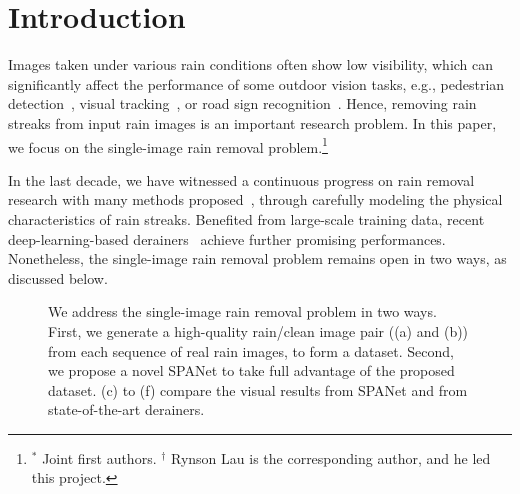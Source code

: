 \documentclass[10pt,twocolumn,letterpaper]{article}
\begin{document}
\section{Introduction}
Images taken under various rain conditions often show low visibility, which can significantly affect the performance of some outdoor vision tasks, e.g., pedestrian detection~\cite{mao:cvpr:2017:pd}, visual tracking~\cite{song:cvpr:2018:vital}, or road sign recognition~\cite{zhu:cvpr:2016:tsd}. Hence, removing rain streaks from input rain images is an important research problem. In this paper, we focus on the single-image rain removal problem.{\let\thefootnote\relax\footnote{{$^{*}$ Joint first authors. $^{\dagger}$ Rynson Lau is the corresponding author, and he led this project.}}}


In the last decade, we have witnessed a continuous progress on rain removal research with many methods proposed~\cite{kang:tip:2012:imgdecomp,luo:iccv:2015:dsc,li:cvpr:2016:lp,chang:iccv:2017:lpnr,zhu:iccv:2017:jbo,du:pr:2018:grad}, through carefully modeling the physical characteristics of rain streaks. Benefited from large-scale training data, recent deep-learning-based derainers~\cite{fu:tip:2016:clearing,fu:cvpe:2017:ddn,yang:cvpr:2017:j,zhang:cvpr:2018:did,li:eccv:2018:rsecan,fan:acmmm:2018:rgffn,li:acmmm:2018:nled} achieve further promising performances. Nonetheless, the single-image rain removal problem remains open in two ways, as discussed below.

\begin{figure}[t]
\centering
\centering
{}
\centering
\vspace{-0.1in}
\centering
{}
\centering
{}
\centering
{}
\centering
\caption{We address the single-image rain removal problem in two ways. First, we generate a high-quality rain/clean image pair ((a) and (b)) from each sequence of real rain images, to form a dataset. Second, we propose a novel SPANet to take full advantage of the proposed dataset. (c) to (f) compare the visual results from SPANet and from state-of-the-art derainers.}
\vspace{-5mm}
\label{fig:first}
\end{figure}
\end{document}
